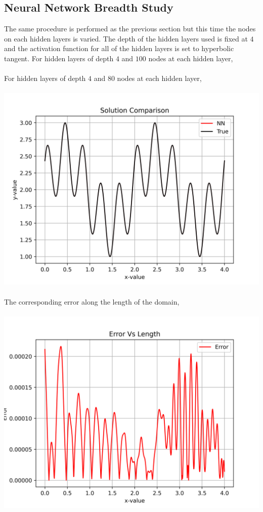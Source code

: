 \documentclass[a4paper, 12pt]{report}
\def\size{0.92}
\begin{document}
\begin{center}
\section{Neural Network Breadth Study}

The same procedure is performed as the previous section but this time the nodes on each hidden layers is varied. The depth of the hidden layers used is fixed at $4$ and the activation function for all of the hidden layers is set to hyperbolic tangent. For hidden layers of depth $4$ and $100$ nodes at each hidden layer,
\\~\\For hidden layers of depth $4$ and $80$ nodes at each hidden layer,
\\~\\\includegraphics[scale=\size]{breadthsol80.png}
\\~\\The corresponding error along the length of the domain,
\\~\\\includegraphics[scale=\size]{breadtherr80.png}

\end{center}
\end{document}
